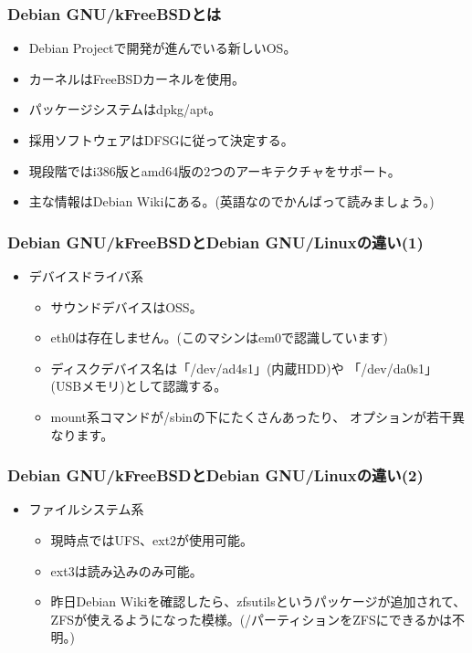 \documentclass[cjk,dvipdfmx,12pt,%
hyperref={bookmarks=true,bookmarksnumbered=true,bookmarksopen=false,%
colorlinks=false,%
pdftitle={Debian GNU/kFreeBSDで暮らせる環境を構築してみる},%
pdfauthor={杉本典充},%
pdfsubject={第38回関西Debian勉強会},%
}]{beamer}
\begin{document}
\begin{frame}[fragile]
\frametitle{Debian GNU/kFreeBSDとは}
\begin{itemize}
  \item Debian Projectで開発が進んでいる新しいOS。
  \item カーネルはFreeBSDカーネルを使用。
  \item パッケージシステムはdpkg/apt。
  \item 採用ソフトウェアはDFSGに従って決定する。
  \item 現段階ではi386版とamd64版の2つのアーキテクチャをサポート。
  \item 主な情報はDebian Wikiにある。(英語なのでかんばって読みましょう。)
\end{itemize}
\end{frame}


\begin{frame}[fragile]
\frametitle{Debian GNU/kFreeBSDとDebian GNU/Linuxの違い(1)}
\begin{itemize}
\item デバイスドライバ系
  \begin{itemize}
  \item サウンドデバイスはOSS。
  \item eth0は存在しません。(このマシンはem0で認識しています)
  \item ディスクデバイス名は「/dev/ad4s1」(内蔵HDD)や
「/dev/da0s1」(USBメモリ)として認識する。
  \item mount系コマンドが/sbinの下にたくさんあったり、
オプションが若干異なります。
  \end{itemize}
\end{itemize}
\end{frame}


\begin{frame}[fragile]
\frametitle{Debian GNU/kFreeBSDとDebian GNU/Linuxの違い(2)}
\begin{itemize}
\item ファイルシステム系
  \begin{itemize}
  \item 現時点ではUFS、ext2が使用可能。
  \item ext3は読み込みのみ可能。
  \item 昨日Debian Wikiを確認したら、zfsutilsというパッケージが追加されて、ZFSが使えるようになった模様。(/パーティションをZFSにできるかは不明。)
  \end{itemize}
\end{itemize}
\end{frame}
\end{document}
